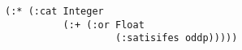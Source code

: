 \begin{lstlisting}[style=reclojureClojure]
(:* (:cat Integer 
          (:+ (:or Float
                   (:satisifes oddp)))))
\end{lstlisting}
